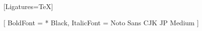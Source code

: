 \usepackage{fontspec}

\setmainfont{Palatino Linotype}[Ligatures=TeX]
\setmonofont{Source Code Pro}
\usepackage{fontawesome}
\usepackage{pifont}

[
  BoldFont = * Black,
  ItalicFont = Noto Sans CJK JP Medium
]

\usepackage[math-style=TeX]{unicode-math}

\usepackage{microtype}
